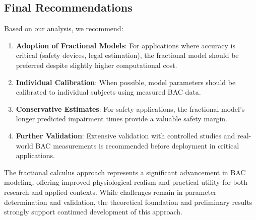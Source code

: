 \documentclass[12pt]{article}
\begin{document}
\subsection{Final Recommendations}

Based on our analysis, we recommend:

\begin{enumerate}
    \item \textbf{Adoption of Fractional Models}: For applications where accuracy is critical (safety devices, legal estimation), the fractional model should be preferred despite slightly higher computational cost.
    
    \item \textbf{Individual Calibration}: When possible, model parameters should be calibrated to individual subjects using measured BAC data.
    
    \item \textbf{Conservative Estimates}: For safety applications, the fractional model's longer predicted impairment times provide a valuable safety margin.
    
    \item \textbf{Further Validation}: Extensive validation with controlled studies and real-world BAC measurements is recommended before deployment in critical applications.
\end{enumerate}

The fractional calculus approach represents a significant advancement in BAC modeling, offering improved physiological realism and practical utility for both research and applied contexts. While challenges remain in parameter determination and validation, the theoretical foundation and preliminary results strongly support continued development of this approach.
\end{document}
